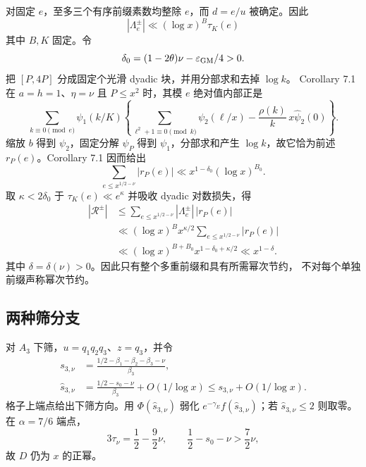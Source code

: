 \documentclass[UTF8,10pt,a4paper]{ctexart}
\newcommand{\1}{\mathbf{1}}
\theoremstyle{remark}
\begin{document}
对固定 $e$，至多三个有序前缀素数均整除 $e$，而 $d=e/u$ 被确定。因此
\[
 |\Lambda_e^\pm|\ll(\log x)^B\tau_K(e)
\]
其中 $B,K$ 固定。令
\[
 \delta_0=(1-2\theta)\nu-\varepsilon_{\rm GM}/4>0.
\]
把 $[P,4P]$ 分成固定个光滑 dyadic 块，并用分部求和去掉 $\log k$。
Corollary 7.1 在 $a=h=1$、$\eta=\nu$ 且 $P\le x^2$ 时，其模 $e$
绝对值内部正是
\[
 \sum_{k\equiv0\pmod e}\psi_1(k/K)
 \left\{\sum_{\ell^2+1\equiv0\pmod k}\psi_2(\ell/x)
       -\frac{\rho(k)}k\,x\widehat\psi_2(0)\right\}.
\]
缩放 $b$ 得到 $\psi_2$，固定分解 $\psi_P$ 得到 $\psi_1$，分部求和产生
$\log k$，故它恰为前述 $r_P(e)$。Corollary 7.1 因而给出
\[
 \sum_{e\le x^{1/2-\nu}}|r_P(e)|
 \ll x^{1-\delta_0}(\log x)^{B_0}.
\]
取 $\kappa<2\delta_0$ 于 $\tau_K(e)\ll e^\kappa$ 并吸收 dyadic 对数损失，得
\[
\begin{aligned}
 |\mathcal R^\pm|
 &\le\sum_{e\le x^{1/2-\nu}}|\Lambda_e^\pm|\,|r_P(e)|\\
 &\ll(\log x)^Bx^{\kappa/2}
       \sum_{e\le x^{1/2-\nu}}|r_P(e)|\\
 &\ll(\log x)^{B+B_0}x^{1-\delta_0+\kappa/2}
 \ll x^{1-\delta}.
\end{aligned}
\]
其中 $\delta=\delta(\nu)>0$。因此只有整个多重前缀和具有所需幂次节约，
不对每个单独前缀声称幂次节约。

\subsection{两种筛分支}
对 $A_3$ 下筛，$u=q_1q_2q_3$、$z=q_3$，并令
\[
\begin{aligned}
s_{3,\nu}
&=\frac{1/2-\beta_1-\beta_2-\beta_3-\nu}{\beta_3},\\
\widehat s_{3,\nu}
&=\frac{1/2-s_0-\nu}{\beta_3}+O(1/\log x)
\le s_{3,\nu}+O(1/\log x).
\end{aligned}
\]
格子上端点给出下筛方向。用 $\Phi(\widehat s_{3,\nu})$ 弱化
$e^{-\gamma_E}f(\widehat s_{3,\nu})$；若
$\widehat s_{3,\nu}\le2$ 则取零。在 $\alpha=7/6$ 端点，
\[
 3\tau_\nu=\frac12-\frac92\nu,\qquad
 \frac12-s_0-\nu>\frac72\nu,
\]
故 $D$ 仍为 $x$ 的正幂。
\end{document}
